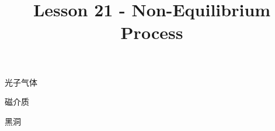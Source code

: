 \documentclass[CJK]{beamer}
\title{Lesson 21 - Non-Equilibrium Process}
\author{}
\date{}
\begin{document}

\begin{frame}
\bch
\bitem
\item{光子气体}
\item{磁介质}
\item{黑洞}  
\eitem
\ech
\end{frame}
\end{document}

